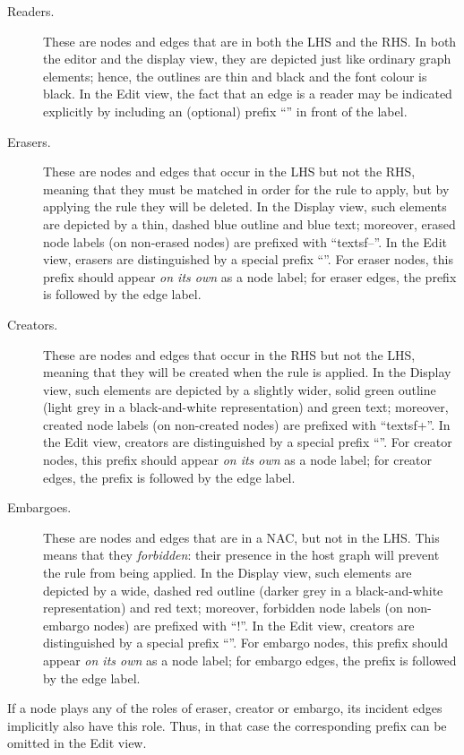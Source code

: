 \begin{description}
\item[Readers.] These are nodes and edges that are in both the LHS and the RHS.
  In both the editor and the display view, they are depicted just like ordinary
  graph elements; hence, the outlines are thin and black and the font colour is
  black. In the Edit view, the fact that an edge is a reader may be indicated
  explicitly by including an (optional) prefix ``\useP'' in front of the label.

\item[Erasers.] These are nodes and edges that occur in the LHS but not the
  RHS, meaning that they must be matched in order for the rule to apply, but by
  applying the rule they will be deleted. In the Display view, such elements
  are depicted by a thin, dashed blue outline and blue text; moreover, erased
  node labels (on non-erased nodes) are prefixed with ``textsf{--}''. In the
  Edit view, erasers are distinguished by a special prefix ``\delP''. For
  eraser nodes, this prefix should appear \emph{on its own} as a node label;
  for eraser edges, the prefix is followed by the edge label.

\item[Creators.] These are nodes and edges that occur in the RHS but not the
  LHS, meaning that they will be created when the rule is applied. In the
  Display view, such elements are depicted by a slightly wider, solid green
  outline (light grey in a black-and-white representation) and green text;
  moreover, created node labels (on non-created nodes) are prefixed with
  ``textsf{+}''. In the Edit view, creators are distinguished by a special
  prefix ``\newP''. For creator nodes, this prefix should appear \emph{on its
  own} as a node label; for creator edges, the prefix is followed by the edge
  label.

\item[Embargoes.] These are nodes and edges that are in a NAC, but not in the
  LHS. This means that they \emph{forbidden}: their presence in the host graph
  will prevent the rule from being applied. In the Display view, such elements
  are depicted by a wide, dashed red outline (darker grey in a black-and-white
  representation) and red text; moreover, forbidden node labels (on non-embargo
  nodes) are prefixed with ``\textsf{!}''. In the Edit view, creators are
  distinguished by a special prefix ``\notP''. For embargo nodes, this prefix
  should appear \emph{on its own} as a node label; for embargo edges, the
  prefix is followed by the edge label.
\end{description}
%
If a node plays any of the roles of eraser, creator or embargo, its incident
edges implicitly also have this role. Thus, in that case the corresponding
prefix can be omitted in the Edit view.

